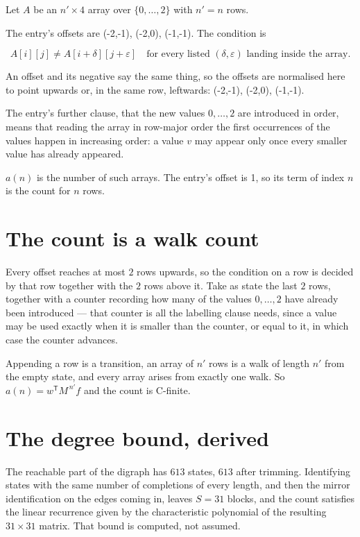 \documentclass[11pt]{article}
\theoremstyle{definition}
\begin{document}
Let $A$ be an $n' \times 4$ array over $\{0,\dots,2\}$ with $n' = n$ rows.

The entry's offsets are (-2,-1), (-2,0), (-1,-1). The condition is

\[A[i][j] \ne A[i{+}\delta][j{+}\varepsilon]\quad\text{for every listed }(\delta,\varepsilon)\text{ landing inside the array.}\]

An offset and its negative say the same thing, so the offsets are normalised here to point upwards or, in the same row, leftwards: (-2,-1), (-2,0), (-1,-1).

The entry's further clause, that the new values $0,\dots,2$ are introduced in order, means that reading the array in row-major order the first occurrences of the values happen in increasing order: a value $v$ may appear only once every smaller value has already appeared.

$a(n)$ is the number of such arrays. The entry's offset is 1, so its term of index $n$ is the count for $n$ rows.

\section{The count is a walk count}

Every offset reaches at most $2$ rows upwards, so the condition on a row is decided by that row together with the $2$ rows above it. Take as state the last $2$ rows, together with a counter recording how many of the values $0,\dots,2$ have already been introduced --- that counter is all the labelling clause needs, since a value may be used exactly when it is smaller than the counter, or equal to it, in which case the counter advances.

Appending a row is a transition, an array of $n'$ rows is a walk of length $n'$ from the empty state, and every array arises from exactly one walk. So $a(n) = w^{\mathsf T}M^{\,n'}f$ and the count is C-finite.

\section{The degree bound, derived}

The reachable part of the digraph has $613$ states, $613$ after trimming. Identifying states with the same number of completions of every length, and then the mirror identification on the edges coming in, leaves $S = 31$ blocks, and the count satisfies the linear recurrence given by the characteristic polynomial of the resulting $31\times31$ matrix. That bound is computed, not assumed.
\end{document}

